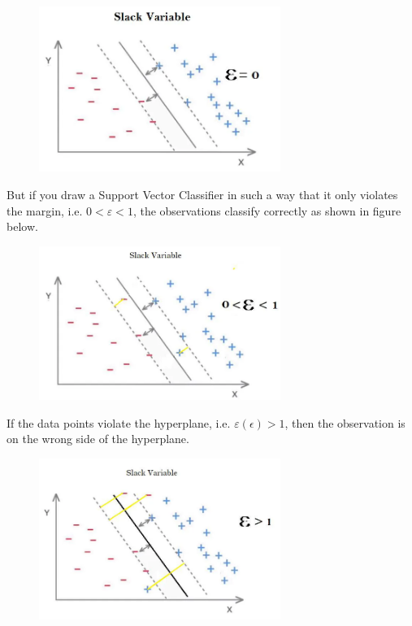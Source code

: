\documentclass{beamer}
\begin{document}
\begin{frame}
  \begin{figure}
    \includegraphics[width=0.7\textwidth]{Slack}
  \end{figure}
\end{frame}

\begin{frame}
  But if you draw a Support Vector Classifier in such a way that it only violates the margin, i.e. $0< \varepsilon < 1$, the observations classify correctly as shown in figure below.
  \begin{figure}
    \includegraphics[width=0.7\textwidth]{Slack2}
  \end{figure}
\end{frame}

\begin{frame}
  If the data points violate the hyperplane, i.e. $\varepsilon(ϵ) > 1$, then the observation is on the wrong side of the hyperplane.

  \begin{figure}
    \includegraphics[width=0.7\textwidth]{Slack3}
  \end{figure}
\end{frame}
\end{document}
